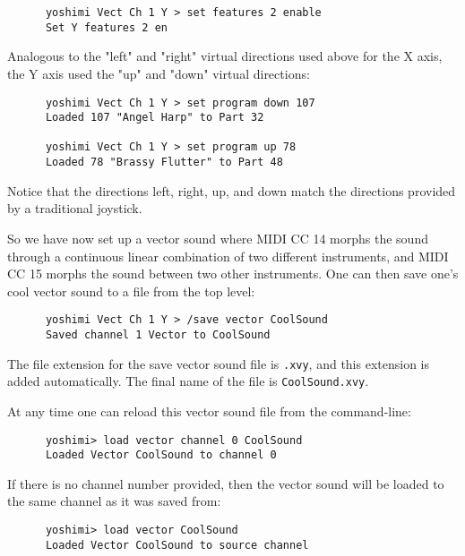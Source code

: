    \begin{verbatim}
      yoshimi Vect Ch 1 Y > set features 2 enable
      Set Y features 2 en
   \end{verbatim}

   Analogous to the "left" and "right" virtual directions used above for the X
   axis, the Y axis used the "up" and "down" virtual directions:

   \begin{verbatim}
      yoshimi Vect Ch 1 Y > set program down 107
      Loaded 107 "Angel Harp" to Part 32

      yoshimi Vect Ch 1 Y > set program up 78
      Loaded 78 "Brassy Flutter" to Part 48
   \end{verbatim}

   Notice that the directions left, right, up, and down match the directions
   provided by a traditional joystick.

   So we have now set up a vector sound where MIDI CC 14 morphs the sound
   through a continuous linear combination of two different instruments,
   and MIDI CC 15 morphs the sound between two other instruments.
   One can then save one's cool vector sound to a file from the top level:

   \begin{verbatim}
      yoshimi Vect Ch 1 Y > /save vector CoolSound
      Saved channel 1 Vector to CoolSound
   \end{verbatim}

   The file extension for the save vector sound file is \texttt{.xvy}, and
   this extension is added automatically.  The final name of the file is
   \texttt{CoolSound.xvy}.

   At any time one can reload this vector sound file from the command-line:

   \begin{verbatim}
      yoshimi> load vector channel 0 CoolSound
      Loaded Vector CoolSound to channel 0
   \end{verbatim}

   If there is no channel number provided, then the vector sound
   will be loaded to the same channel as it was saved from:

   \begin{verbatim}
      yoshimi> load vector CoolSound
      Loaded Vector CoolSound to source channel
   \end{verbatim}

